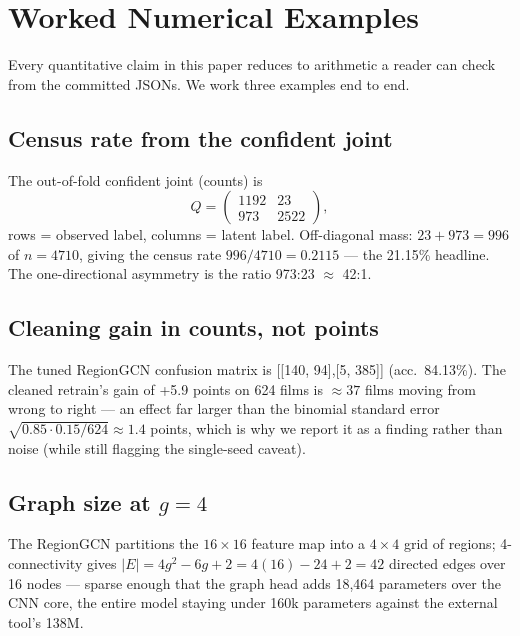 
\section{Worked Numerical Examples}
\label{sec:worked}
Every quantitative claim in this paper reduces to arithmetic a reader
can check from the committed JSONs. We work three examples end to end.
\subsection{Census rate from the confident joint}
The out-of-fold confident joint (counts) is
\begin{equation}
Q = \begin{pmatrix} 1192 & 23 \\ 973 & 2522 \end{pmatrix},
\end{equation}
rows = observed label, columns = latent label. Off-diagonal mass:
$23+973=996$ of $n=4710$, giving the census rate
$996/4710 = 0.2115$ --- the 21.15\% headline. The one-directional asymmetry
is the ratio 973:23 $\approx$ 42:1.
\subsection{Cleaning gain in counts, not points}
The tuned RegionGCN confusion matrix is [[140, 94],[5, 385]]
(acc.\ 84.13\%). The cleaned retrain's gain of +5.9 points on 624 films
is $\approx 37$ films moving from wrong to right --- an effect far
larger than the binomial standard error
$\sqrt{0.85\cdot0.15/624}\approx 1.4$ points, which is why we report it
as a finding rather than noise (while still flagging the single-seed
caveat).
\subsection{Graph size at $g=4$}
The RegionGCN partitions the $16\times16$ feature map into a $4\times4$
grid of regions; 4-connectivity gives
$|E| = 4g^2-6g+2 = 4(16)-24+2 = 42$ directed edges over 16 nodes ---
sparse enough that the graph head adds 18{,}464 parameters over the
CNN core, the entire model staying under 160k parameters against the
external tool's 138M.
